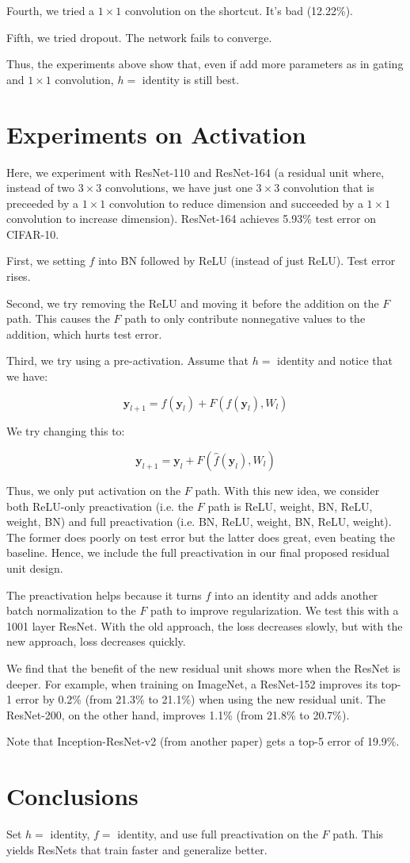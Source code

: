 \documentclass[a4paper]{article}
\begin{document}
Fourth, we tried a $1 \times 1$ convolution on the shortcut. It's bad (12.22\%).

Fifth, we tried dropout. The network fails to converge.

Thus, the experiments above show that, even if add more parameters as in
gating and $1 \times 1$ convolution, $h = $ identity is still best.

\section{Experiments on Activation}
Here, we experiment with ResNet-110 and ResNet-164 (a residual unit where,
instead of two $3 \times 3$ convolutions, we have just one
$3 \times 3$ convolution that is preceeded by a $1 \times 1$ convolution to
reduce dimension and succeeded by a $1 \times 1$ convolution to increase
dimension). ResNet-164 achieves 5.93\% test error on CIFAR-10.

First, we setting $f$ into BN followed by ReLU (instead of just ReLU). Test
error rises.

Second, we try removing the ReLU and moving it before the addition on the $F$
path. This causes the $F$ path to only contribute nonnegative values to the
addition, which hurts test error.

Third, we try using a pre-activation. Assume that $h = $ identity and notice
that we have:

$$
\mathbf{y}_{l+1} = f(\mathbf{y}_l) + F(f(\mathbf{y}_l), W_l)
$$

We try changing this to:

$$
\mathbf{y}_{l+1} = \mathbf{y}_l + F(\hat{f}(\mathbf{y}_l), W_l)
$$

Thus, we only put activation on the $F$ path. With this new idea, we consider
both ReLU-only preactivation (i.e. the $F$ path is ReLU, weight, BN, ReLU,
weight, BN) and full preactivation (i.e. BN, ReLU, weight, BN, ReLU, weight).
The former does poorly on test error but the latter does great, even beating
the baseline. Hence, we include the full preactivation in our final proposed
residual unit design.

The preactivation helps because it turns $f$ into an identity and adds another
batch normalization to the $F$ path to improve regularization. We test this
with a 1001 layer ResNet. With the old approach, the loss decreases slowly,
but with the new approach, loss decreases quickly.

We find that the benefit of the new residual unit shows more when the ResNet is
deeper. For example, when training on ImageNet, a ResNet-152 improves its
top-1 error by 0.2\% (from 21.3\% to 21.1\%) when using the new residual unit.
The ResNet-200, on the other hand, improves 1.1\% (from 21.8\% to 20.7\%).

Note that Inception-ResNet-v2 (from another paper) gets a top-5 error of 19.9\%.

\section{Conclusions}
Set $h = $ identity, $f = $ identity, and use full preactivation on the $F$
path. This yields ResNets that train faster and generalize better.
\end{document}
